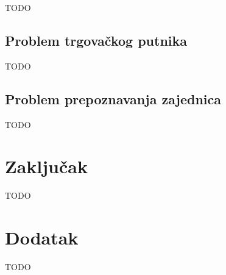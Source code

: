 \documentclass[a4paper]{article}
\begin{document}
TODO



\subsection{Problem trgovačkog putnika}
\label{sec:trgovacki_putnik}

TODO
















\subsection{Problem prepoznavanja zajednica}
\label{sec:prepoznavanje_zajednica}

TODO












\section{Zaključak}
\label{sec:zakljucak}

TODO

\appendix
 


\appendix
\section{Dodatak}
TODO
\end{document}
